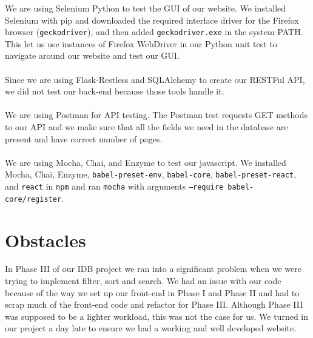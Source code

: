 \documentclass[12pt]{article}
\newcommand{\code}[1]{\texttt{#1}}
\begin{document}
We are using Selenium Python to test the GUI of our website. We installed Selenium with pip and downloaded the required interface driver for the Firefox browser (\code{geckodriver}), and then added \code{geckodriver.exe} in the system PATH. This let us use instances of Firefox WebDriver in our Python unit test to navigate around our website and test our GUI.
\\
\\
Since we are using Flask-Restless and SQLAlchemy to create our RESTFul API, we did not test our back-end because those tools handle it.
\\
\\
We are using Postman for API testing. The Postman test requests GET methods to our API and we make sure that all the fields we need in the database are present and have correct number of pages. 
\\
\\
We are using Mocha, Chai, and Enzyme to test our javascript. We installed Mocha, Chai, Enzyme, \code{babel-preset-env}, \code{babel-core}, \code{babel-preset-react}, and \code{react} in \code{npm} and ran \code{mocha} with arguments \code{--require babel-core/register}.

\section{Obstacles}
In Phase III of our IDB project we ran into a significant problem when we were trying to implement filter, sort and search. We had an issue with our code because of the way we set up our front-end in Phase I and Phase II and had to scrap much of the front-end code and refactor for Phase III. Although Phase III was supposed to be a lighter workload, this was not the case for us. We turned in our project a day late to ensure we had a working and well developed website.
\end{document}
